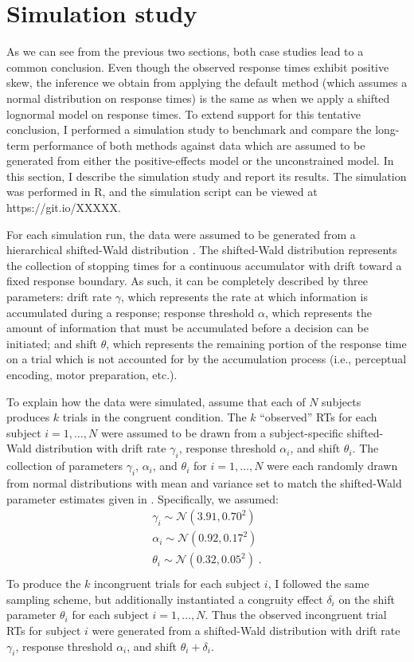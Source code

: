 \documentclass[12pt,twoside,a4paper]{article}
\begin{document}
\section{Simulation study}

As we can see from the previous two sections, both case studies lead to a common conclusion. Even though the observed response times exhibit positive skew, the inference we obtain from applying the default \citet{haaf2017} method (which assumes a normal distribution on response times) is the same as when we apply a shifted lognormal model on response times. To extend support for this tentative conclusion, I performed a simulation study to benchmark and compare the long-term performance of both methods against data which are assumed to be generated from either the positive-effects model or the unconstrained model. In this section, I describe the simulation study and report its results. The simulation was performed in R, and the simulation script can be viewed at https://git.io/XXXXX.

For each simulation run, the data were assumed to be generated from a hierarchical shifted-Wald distribution \citep[e.g., ][]{faulkenberry2018wald}. The shifted-Wald distribution represents the collection of stopping times for a continuous accumulator with drift toward a fixed response boundary. As such, it can be completely described by three parameters: drift rate $\gamma$, which represents the rate at which information is accumulated during a response; response threshold $\alpha$, which represents the amount of information that must be accumulated before a decision can be initiated; and shift $\theta$, which represents the remaining portion of the response time on a trial which is not accounted for by the accumulation process (i.e., perceptual encoding, motor preparation, etc.).

To explain how the data were simulated, assume that each of $N$ subjects produces $k$ trials in the congruent condition. The $k$ ``observed'' RTs for each subject $i=1,\dots,N$ were assumed to be drawn from a subject-specific shifted-Wald distribution with drift rate $\gamma_i$, response threshold $\alpha_i$, and shift $\theta_i$. The collection of parameters $\gamma_i$, $\alpha_i$, and $\theta_i$ for $i=1,\dots,N$ were each randomly drawn from normal distributions with mean and variance set to match the shifted-Wald parameter estimates given in \citet{faulkenberry2018wald}. Specifically, we assumed:%
\begin{align*}
  \gamma_i \sim \mathcal{N}(3.91, 0.70^2)\\
  \alpha_i \sim \mathcal{N}(0.92, 0.17^2)\\
  \theta_i \sim \mathcal{N}(0.32, 0.05^2) \; . \\
\end{align*}%
To produce the $k$ incongruent trials for each subject $i$, I followed the same sampling scheme, but additionally instantiated a congruity effect $\delta_i$ on the shift parameter $\theta_i$ for each subject $i=1,\dots,N$. Thus the observed incongruent trial RTs for subject $i$ were generated from a shifted-Wald distribution with drift rate $\gamma_i$, response threshold $\alpha_i$, and shift $\theta_i + \delta_i$.
\end{document}
